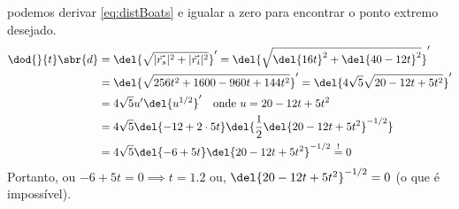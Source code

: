 \documentclass[]{IMTexam}
\begin{document}
\begin{questions}
\begin{solution}
\begin{multi}
		\end{multi}

		podemos derivar \ref{eq:distBoats} e igualar a zero para encontrar o ponto extremo desejado.
		\begin{align*}
			\dod{}{t}\sbr{d} & =\del{\sqrt{|\vec{r_s}|^{2}+|\vec{r_i}|^{2}}}'=\del{\sqrt{\del{16t}^{2}+\del{40-12t}^{2}}}' \\
			                 & =\del{\sqrt{256t^{2}+1600-960t+144t^{2}}}'=\del{4\sqrt{5}\sqrt{20-12t+5t^{2}}}'             \\
			                 & =4\sqrt{5}u'\del{u^{1/2}}'\quad\text{onde }u=20-12t+5t^{2}                                  \\
			                 & =4\sqrt{5}\del{-12+2\cdot5t}\del{\dfrac{1}{2}\del{20-12t+5t^{2}}^{-1/2}}                    \\
			                 & =4\sqrt{5}\del{-6+5t}\del{20-12t+5t^{2}}^{-1/2}\stackrel{!}{=}0
		\end{align*}
		Portanto, ou $ -6+5t=0\implies t=\num{1.2} $ ou, $ \del{20-12t+5t^{2}}^{-1/2}=0 $ (o que é impossível).


\end{solution}
\end{questions}
\end{document}
